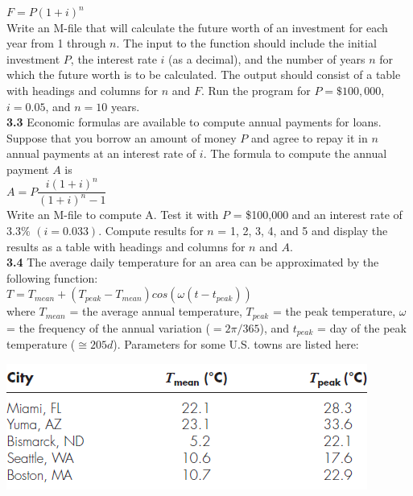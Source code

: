 \documentclass[../main.tex]{subfiles}
\begin{document}
\begin{multicols}{2}
    $F = P(1+i)^n$\\

    \noindent
    Write an M-file that will calculate the future worth of an investment
    for each year from 1 through $n$. The input to the
    function should include the initial investment $P$, the interest
    rate $i$ (as a decimal), and the number of years $n$ for which the
    future worth is to be calculated. The output should consist of
    a table with headings and columns for $n$ and $F$. Run the program
    for $P = \$100,000$, $i = 0.05$, and $n = 10$ years.\\

    \noindent\textbf{3.3} Economic formulas are available to compute annual
    payments for loans. Suppose that you borrow an amount of
    money $P$ and agree to repay it in $n$ annual payments at an
    interest rate of $i$. The formula to compute the annual payment
    $A$ is\\

    $A = P\dfrac{i(1+i)^n}{(1+i)^n - 1}$\\

    \noindent
    Write an M-file to compute A. Test it with $P$ = \$100,000 and
    an interest rate of $3.3\%$ $(i = 0.033)$. Compute results for $n$ =
    1, 2, 3, 4, and 5 and display the results as a table with headings
    and columns for $n$ and $A$.\\

    \noindent\textbf{3.4} The average daily temperature for an area can be approximated
    by the following function:\\

    $T = T_{mean} + (T_{peak}-T_{mean})cos(\omega(t-t_{peak}))$\\

    \noindent where $T_{mean}$ = the average annual temperature, $T_{peak}$ = the
    peak temperature, $\omega$ = the frequency of the annual variation ($=2\pi/365$),
    and $t_{peak}$ = day of the peak temperature ($\cong 205 d$). Parameters for some
    U.S. towns are listed here:\\

    \noindent
    \begin{minipage}{\linewidth}
        \centering
        \includegraphics[width=0.9\linewidth]{./images/problem_3_3_3}
    \end{minipage}


\end{multicols}
\end{document}
